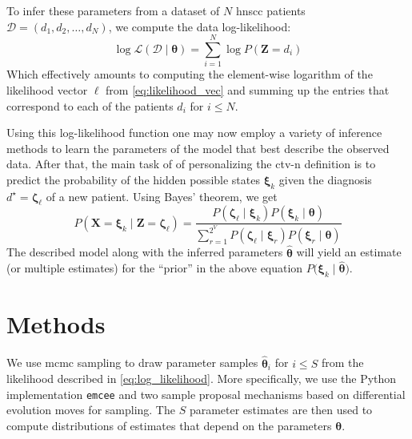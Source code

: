 \documentclass[twocolumn]{aastex631}
\begin{document}
To infer these parameters from a dataset of $N$ \gls{hnscc} patients $\boldsymbol{\mathcal{D}} = \left( d_1, d_2, \ldots, d_N \right)$, we compute the data log-likelihood:
%
\begin{equation} \label{eq:log_likelihood}
    \log\mathcal{L} \left( \boldsymbol{\mathcal{D}} \mid \boldsymbol{\theta} \right) = \sum_{i=1}^N \log P \left( \mathbf{Z} = d_i \right)
\end{equation}
%
Which effectively amounts to computing the element-wise logarithm of the likelihood vector $\boldsymbol{\ell}$ from \cref{eq:likelihood_vec} and summing up the entries that correspond to each of the patients $d_i$ for $i\leq N$. 

Using this log-likelihood function one may now employ a variety of inference methods to learn the parameters of the model that best describe the observed data. After that, the main task of of personalizing the \gls{ctv-n} definition is to predict the probability of the hidden possible states $\boldsymbol{\xi}_k$ given the diagnosis $d^\star=\boldsymbol{\zeta}_\ell$ of a new patient. Using Bayes' theorem, we get
%
\begin{equation}
    P\left( \mathbf{X}=\boldsymbol{\xi}_k \mid \mathbf{Z}=\boldsymbol{\zeta}_\ell \right) = \frac{P\left( \boldsymbol{\zeta}_\ell \mid \boldsymbol{\xi}_k \right) P\left( \boldsymbol{\xi}_k \mid \boldsymbol{\theta} \right)}{\sum_{r=1}^{2^V} P\left( \boldsymbol{\zeta}_\ell \mid \boldsymbol{\xi}_r \right) P\left( \boldsymbol{\xi}_r \mid \boldsymbol{\theta} \right) }
\end{equation}
%
The described model along with the inferred parameters $\boldsymbol{\hat{\theta}}$ will yield an estimate (or multiple estimates) for the ``prior'' in the above equation $P\big( \boldsymbol{\xi}_k \mid \boldsymbol{\hat{\theta}} \big)$.

\section{Methods}
\label{sec:methods}

We use \gls{mcmc} sampling to draw parameter samples $\boldsymbol{\hat{\theta}}_i$ for $i \leq S$ from the likelihood described in \cref{eq:log_likelihood}. More specifically, we use the Python implementation \texttt{emcee} \cite{foreman-mackey_emcee_2013} and two sample proposal mechanisms based on differential evolution moves \cite{ter_braak_differential_2008,nelson_run_2013} for sampling. The $S$ parameter estimates are then used to compute distributions of estimates that depend on the parameters $\boldsymbol{\theta}$.
\end{document}
